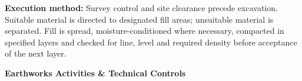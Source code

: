 \noindent
\begin{minipage}[t]{0.185\textwidth}\end{minipage}\hfill
\begin{minipage}[t]{0.185\textwidth}\end{minipage}\hfill
\begin{minipage}[t]{0.185\textwidth}\end{minipage}\hfill
\begin{minipage}[t]{0.185\textwidth}\end{minipage}\hfill
\begin{minipage}[t]{0.185\textwidth}\end{minipage}

\vspace{0.20cm}

\noindent
\begin{tcolorbox}[enhanced, colback=mhoffwhite, colframe=mhlightgray, boxrule=0.7pt, arc=4pt, left=9pt, right=9pt, top=7pt, bottom=7pt, borderline west={3pt}{0pt}{mhgold}, drop shadow=black!4]
    {\fontsize{8.1pt}{11.0pt}\selectfont\color{mhtext}
    \textbf{Execution method:} Survey control and site clearance precede excavation. Suitable material is directed to designated fill areas; unsuitable material is separated. Fill is spread, moisture-conditioned where necessary, compacted in specified layers and checked for line, level and required density before acceptance of the next layer.
    }
\end{tcolorbox}

\vfill

\noindent
{\large\bfseries\color{mhnavy} Earthworks Activities \& Technical Controls}
\vspace{0.10cm}


